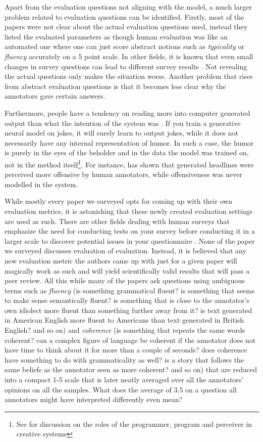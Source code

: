 \documentclass[11pt,a4paper]{article}
\begin{document}
Apart from the evaluation questions not aligning with the model, a much larger problem related to evaluation questions can be identified. Firstly, most of the papers were not clear about the actual evaluation questions used, instead they listed the evaluated parameters as though human evaluation was like an automated one where one can just score abstract notions such as \textit{typicality} or \textit{fluency} accurately on a 5 point scale. In other fields, it is known that even small changes in survey questions can lead to different survey results \cite{kalton1982effect,de2011framing,de2012effect}. Not revealing the actual questions only makes the situation worse. Another problem that rises from abstract evaluation questions is that it becomes less clear why the annotators gave certain answers.

Furthermore, people have a tendency on reading more into computer generated output than what the intention of the system was \cite{Veale+2016+73+92}. If you train a generative neural model on jokes, it will surely learn to output jokes, while it does not necessarily have any internal representation of humor. In such a case, the humor is purely in the eyes of the beholder and in the data the model was trained on, not in the method itself\footnote{See \citet{colton2008creativity} for discussion on the roles of the programmer, program and perceiver in creative systems}. For instance, \citet{alnajjar2019no} has shown that generated headlines were perceived more offensive by human annotators, while offensiveness was never modelled in the system.

While mostly every paper we surveyed opts for coming up with their own evaluation metrics, it is astonishing that these newly created evaluation settings are used as such. There are other fields dealing with human surveys that emphasize the need for conducting tests on your survey before conducting it in a larger scale to discover potential issues in your questionnaire \cite{collins2003pretesting,presser2004methods,thomas2004pilot}. None of the paper we surveyed discusses evaluation of evaluation. Instead, it is believed that any new evaluation metric the authors came up with just for a given paper will magically work as such and will yield scientifically valid results that will pass a peer review. All this while many of the papers ask questions using ambiguous terms such as \textit{fluency} (is something grammatical fluent? is something that seems to make sense semantically fluent? is something that is close to the annotator's own idiolect more fluent than something further away from it? is text generated in American English more fluent to Americans than text generated in British English? and so on) and \textit{coherence} (is something that repeats the same words coherent? can a complex figure of language be coherent if the annotator does not have time to think about it for more than a couple of seconds? does coherence have something to do with grammaticality as well? is a story that follows the same beliefs as the annotator seen as more coherent? and so on) that are reduced into a compact 1-5 scale that is later neatly averaged over all the annotators' opinions on all the samples. What does the average of 3.5 on a question all annotators might have interpreted differently even mean?
\end{document}
